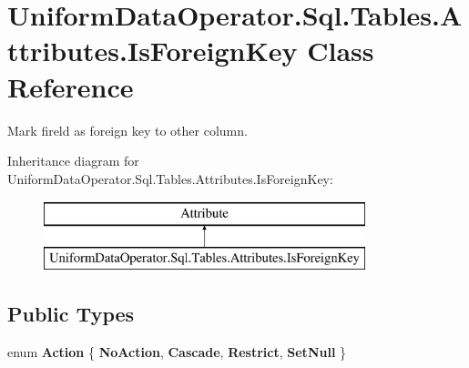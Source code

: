 \hypertarget{class_uniform_data_operator_1_1_sql_1_1_tables_1_1_attributes_1_1_is_foreign_key}{}\section{Uniform\+Data\+Operator.\+Sql.\+Tables.\+Attributes.\+Is\+Foreign\+Key Class Reference}
\label{class_uniform_data_operator_1_1_sql_1_1_tables_1_1_attributes_1_1_is_foreign_key}


Mark fireld as foreign key to other column.  


Inheritance diagram for Uniform\+Data\+Operator.\+Sql.\+Tables.\+Attributes.\+Is\+Foreign\+Key\+:\begin{figure}[H]
\begin{center}
\leavevmode
\includegraphics[height=2.000000cm]{d8/d77/class_uniform_data_operator_1_1_sql_1_1_tables_1_1_attributes_1_1_is_foreign_key}
\end{center}
\end{figure}
\subsection*{Public Types}
\begin{DoxyCompactItemize}
\item 
\mbox{\label{class_uniform_data_operator_1_1_sql_1_1_tables_1_1_attributes_1_1_is_foreign_key_a102e63fdaae946e6bb24ecb5e88a6223}} 
enum {\bfseries Action} \{ {\bfseries No\+Action}, 
{\bfseries Cascade}, 
{\bfseries Restrict}, 
{\bfseries Set\+Null}
 \}
\end{DoxyCompactItemize}
